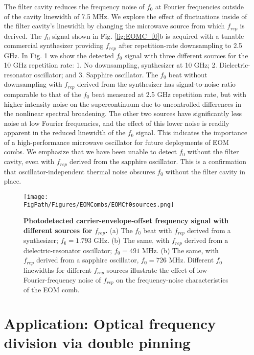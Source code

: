 The filter cavity reduces the frequency noise of $f_0$ at Fourier frequencies outside of the cavity linewidth of 7.5 MHz. We explore the effect of fluctuations inside of the filter cavity's linewidth by changing the microwave source from which $f_{rep}$ is derived. The $f_0$ signal shown in Fig. \ref{fig:EOMC_f0}b is acquired with a tunable commercial synthesizer providing $f_{rep}$ after repetition-rate downsampling to 2.5 GHz. In Fig. \ref{fig:EOMC_f0_sources} we show the detected $f_0$ signal with three different sources for the 10 GHz repetition rate: 1. No downsampling, synthesizer at 10 GHz; 2. Dielectric-resonator oscillator; and 3. Sapphire oscillator. The $f_0$ beat without downsampling with $f_{rep}$ derived from the synthesizer has signal-to-noise ratio comparable to that of the $f_0$ beat measured at 2.5 GHz repetition rate, but with higher intensity noise on the supercontinuum due to uncontrolled differences in the nonlinear spectral broadening. The other two sources have significantly less noise at low Fourier frequencies, and the effect of this lower noise is readily apparent in the reduced linewidth of the $f_0$ signal. This indicates the importance of a high-performance microwave oscillator for future deployments of EOM combs. We emphasize that we have been unable to detect $f_0$ without the filter cavity, even with $f_{rep}$ derived from the sapphire oscillator. This is a confirmation that oscillator-independent thermal noise obscures $f_0$ without the filter cavity in place.



\begin{figure}[htpb]
	\begin{center}
		\texttt{[image: \\FigPath/Figures/EOMCombs/EOMCf0sources.png]}
	\end{center}
	\caption[Photodetected carrier-envelope-offset frequency signal with different sources for $f_{rep}$]{\textbf{Photodetected carrier-envelope-offset frequency signal with different sources for $f_{rep}$.} (a) The $f_0$ beat with $f_{rep}$ derived from a synthesizer; $f_0=1.793$ GHz. (b) The same, with $f_{rep}$ derived from a dielectric-resonator oscillator; $f_0=491$ MHz. (b) The same, with $f_{rep}$ derived from a sapphire oscillator, $f_0=726$ MHz. Different $f_0$ linewidths for different $f_{rep}$ sources illustrate the effect of low-Fourier-frequency noise of $f_{rep}$ on the frequency-noise characteristics of the EOM comb.}
	\label{fig:EOMC_f0_sources}
\end{figure} 

\section{Application: Optical frequency division via double pinning}

